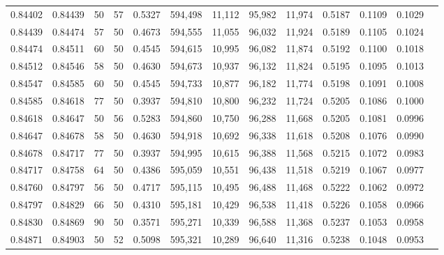\begin{tabular}{rrrrrrrrrrrrr}
0.84402 & 0.84439 &    50 &  57 &                                     0.5327 & 594,498 &  11,112 &  95,982 &  11,974 & 0.5187 & 0.1109 & 0.1029 \\
0.84439 & 0.84474 &    57 &  50 &                                     0.4673 & 594,555 &  11,055 &  96,032 &  11,924 & 0.5189 & 0.1105 & 0.1024 \\
0.84474 & 0.84511 &    60 &  50 &                                     0.4545 & 594,615 &  10,995 &  96,082 &  11,874 & 0.5192 & 0.1100 & 0.1018 \\
0.84512 & 0.84546 &    58 &  50 &                                     0.4630 & 594,673 &  10,937 &  96,132 &  11,824 & 0.5195 & 0.1095 & 0.1013 \\
0.84547 & 0.84585 &    60 &  50 &                                     0.4545 & 594,733 &  10,877 &  96,182 &  11,774 & 0.5198 & 0.1091 & 0.1008 \\
0.84585 & 0.84618 &    77 &  50 &                                     0.3937 & 594,810 &  10,800 &  96,232 &  11,724 & 0.5205 & 0.1086 & 0.1000 \\
0.84618 & 0.84647 &    50 &  56 &                                     0.5283 & 594,860 &  10,750 &  96,288 &  11,668 & 0.5205 & 0.1081 & 0.0996 \\
0.84647 & 0.84678 &    58 &  50 &                                     0.4630 & 594,918 &  10,692 &  96,338 &  11,618 & 0.5208 & 0.1076 & 0.0990 \\
0.84678 & 0.84717 &    77 &  50 &                                     0.3937 & 594,995 &  10,615 &  96,388 &  11,568 & 0.5215 & 0.1072 & 0.0983 \\
0.84717 & 0.84758 &    64 &  50 &                                     0.4386 & 595,059 &  10,551 &  96,438 &  11,518 & 0.5219 & 0.1067 & 0.0977 \\
0.84760 & 0.84797 &    56 &  50 &                                     0.4717 & 595,115 &  10,495 &  96,488 &  11,468 & 0.5222 & 0.1062 & 0.0972 \\
0.84797 & 0.84829 &    66 &  50 &                                     0.4310 & 595,181 &  10,429 &  96,538 &  11,418 & 0.5226 & 0.1058 & 0.0966 \\
0.84830 & 0.84869 &    90 &  50 &                                     0.3571 & 595,271 &  10,339 &  96,588 &  11,368 & 0.5237 & 0.1053 & 0.0958 \\
0.84871 & 0.84903 &    50 &  52 &                                     0.5098 & 595,321 &  10,289 &  96,640 &  11,316 & 0.5238 & 0.1048 & 0.0953 \\

\end{tabular}
